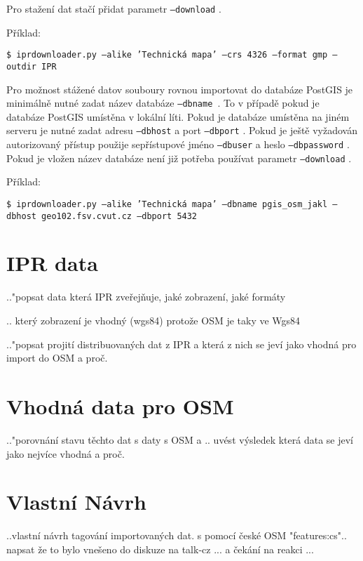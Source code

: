 Pro stažení dat stačí přidat parametr {\tt --download} .

Příklad:

{\tt \$ iprdownloader.py ---alike 'Technická mapa' ---crs 4326 ---format gmp ---outdir IPR}

Pro možnost stážené datov souboury rovnou importovat do databáze PostGIS je 
minimálně nutné zadat název databáze {\tt ---dbname }. To v případě pokud je
databáze PostGIS umístěna v lokální líti. Pokud je databáze umístěna na jiném
serveru je nutné zadat adresu {\tt ---dbhost} a port {\tt ---dbport} . Pokud je
ještě vyžadován autorizovaný přístup použije sepřístupové jméno {\tt ---dbuser} a
heslo {\tt ---dbpassword} . 
Pokud je vložen název databáze není již potřeba používat parametr {\tt ---download} .

Příklad:

{\tt \$ iprdownloader.py ---alike 'Technická mapa' ---dbname pgis\_osm\_jakl ---dbhost geo102.fsv.cvut.cz  ---dbport 5432 } 
 

\section{IPR data}
\label{IPR data}
.."popsat data která IPR zveřejňuje, jaké zobrazení, jaké formáty

.. který zobrazení je vhodný (wgs84) protože OSM je taky ve Wgs84

.."popsat projití distribuovaných dat z IPR a která z nich se jeví jako vhodná 
pro import do OSM a proč.

\section{Vhodná data pro OSM}
\label{Vhodná data pro OSM}
.."porovnání stavu těchto dat s daty s OSM a .. uvést výsledek která data se 
jeví jako nejvíce vhodná a proč.

\section{Vlastní Návrh}
\label{Vlastní Návrh}
..vlastní návrh tagování importovaných dat. s pomocí české OSM "features:cs"..
napsat že to bylo vnešeno do diskuze na talk-cz ... a čekání na reakci ...
 



